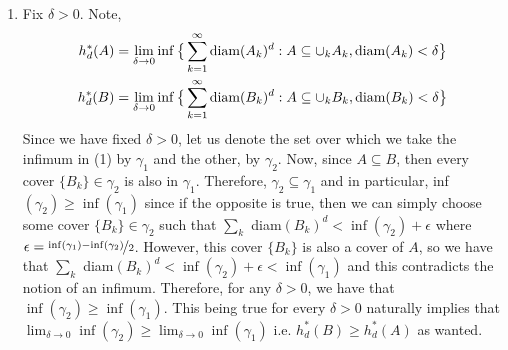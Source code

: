 \documentclass{article}
\begin{document}
\begin{enumerate}
        \item Fix $\delta > 0$. Note,
            \begin{align}
                h_d^*(A) &= \lim_{\delta\to 0}\inf\big{\{}\sum_{k=1}^{\infty} \text{diam}(A_k)^d:A\subseteq\cup_k A_k,
                    \text{diam}(A_k)<\delta\big{\}} \\
                h_d^*(B) &= \lim_{\delta\to 0}\inf\big{\{}\sum_{k=1}^{\infty} \text{diam}(B_k)^d:A\subseteq\cup_k B_k,
                    \text{diam}(B_k)<\delta\big{\}}
            \end{align}
            Since we have fixed $\delta>0$, let us denote the set over which we take the infimum in (1) by $\gamma_1$ and the other,
            by $\gamma_2$. Now, since $A\subseteq B$, then every cover $\{B_k\}\in\gamma_2$ is also in $\gamma_1$. Therefore,
            $\gamma_2\subseteq \gamma_1$ and in particular, inf$(\gamma_2) \geq \inf(\gamma_1)$ since if the opposite is true, then
            we can simply choose some cover $\{B_k\}\in\gamma_2$ such that $\sum_k$ diam$(B_k)^d < \inf(\gamma_2) + \epsilon$ where
            $\epsilon = \nicefrac{\inf(\gamma_1) - \inf(\gamma_2)}{2}$. However, this cover $\{B_k\}$ is also a cover of $A$, so
            we have that $\sum_k$ diam$(B_k)^d < \inf(\gamma_2) + \epsilon < \inf(\gamma_1)$ and this contradicts the notion of
            an infimum. Therefore, for any $\delta>0$, we have that $\inf(\gamma_2)\geq\inf(\gamma_1)$. This being true for every
            $\delta>0$ naturally implies that $\lim_{\delta\to 0} \inf(\gamma_2) \geq \lim_{\delta\to 0} \inf(\gamma_1)$ i.e.
            $h_d^*(B)\geq h_d^*(A)$ as wanted.


\end{enumerate}
\end{document}

